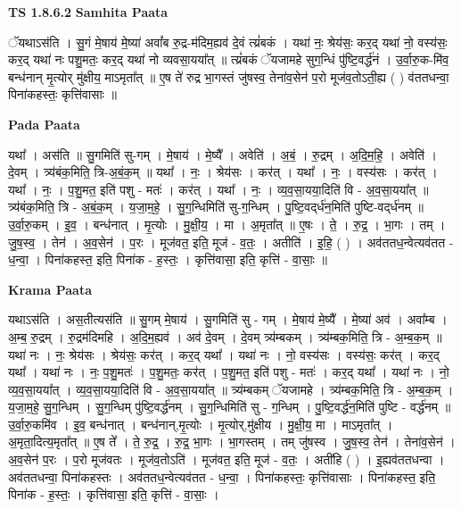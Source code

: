 \documentclass[17pt]{extarticle}
\begin{document}
\textbf{TS 1.8.6.2 } \newline
\textbf{Samhita Paata} \newline

ॅयथाऽस॑ति । सु॒गं मे॒षाय॑ मे॒ष्या॑ अवां᳚ब रु॒द्र-म॑दिम॒ह्यव॑ दे॒वं त्य्रं॑बकं । यथा॑ नः॒ श्रेय॑सः॒ कर॒द् यथा॑ नो॒ वस्य॑सः॒ कर॒द् यथा॑ नः पशु॒मतः॒ कर॒द् यथा॑ नो व्यवसा॒यया᳚त् ॥ त्य्रं॑बकं ॅयजामहे सुग॒न्धिं पु॑ष्टि॒वर्द्ध॑नं । उ॒र्वा॒रु॒क-मि॑व॒ बन्ध॑नान् मृ॒त्योर् मु॑क्षीय॒ माऽमृता᳚त् ॥ ए॒ष ते॑ रुद्र भा॒गस्तं जु॑षस्व॒ तेना॑व॒सेन॑ प॒रो मूज॑व॒तोऽती॒ह्य ( ) व॑ततधन्वा॒ पिना॑कहस्तः॒ कृत्ति॑वासाः ॥ \newline

\textbf{Pada Paata} \newline

यथा᳚ । अस॑ति ॥ सु॒गमिति॑ सु-गम् । मे॒षाय॑ । मे॒ष्यै᳚ । अवेति॑ । अ॒बं॒ । रु॒द्रम् । अ॒दि॒म॒हि॒ । अवेति॑ । दे॒वम् । त्र्य॑बंक॒मिति॒ त्रि-अ॒बं॒क॒म् ॥ यथा᳚ । नः॒ । श्रेय॑सः । कर॑त् । यथा᳚ । नः॒ । वस्य॑सः । कर॑त् । यथा᳚ । नः॒ । प॒शु॒मत॒ इति॑ पशु - मतः॑ । कर॑त् । यथा᳚ । नः॒ । व्य॒व॒सा॒यया॒दिति॑ वि - अ॒व॒सा॒यया᳚त् ॥ त्र्य॑बंक॒मिति॒ त्रि - अ॒बं॒क॒म् । य॒जा॒म॒हे॒ । सु॒ग॒न्धिमिति॑ सु-ग॒न्धिम् । पु॒ष्टि॒वद्‌र्ध॑न॒मिति॑ पुष्टि-वद्‌र्ध॑नम् ॥ उ॒र्वा॒रु॒कम् । इ॒व॒ । बन्ध॑नात् । मृ॒त्योः । मु॒क्षी॒य॒ । मा । अ॒मृता᳚त् ॥ ए॒षः । ते॒ । रु॒द्र॒ । भा॒गः । तम् । जु॒ष॒स्व॒ । तेन॑ । अ॒व॒सेन॑ । प॒रः । मूज॑वत॒ इति॒ मूज॑ - व॒तः॒ । अतीति॑ । इ॒हि॒ ( ) । अव॑ततध॒न्वेत्यव॑तत - ध॒न्वा॒ । पिना॑कहस्त॒ इति॒ पिना॑क - ह॒स्तः॒ । कृत्ति॑वासा॒ इति॒ कृत्ति॑ - वा॒साः॒ ॥  \newline


\textbf{Krama Paata} \newline

यथाऽस॑ति । अस॒तीत्यस॑ति ॥ सु॒गम् मे॒षाय॑ । सु॒गमिति॑ सु - गम् । मे॒षाय॑ मे॒ष्यै᳚ । मे॒ष्या॑ अव॑ । अवा᳚म्ब । अ॒म्ब॒ रु॒द्रम् । रु॒द्रम॑दिमहि । अ॒दि॒म॒ह्यव॑ । अव॑ दे॒वम् । दे॒वम् त्र्य॑म्बकम् । त्र्य॑म्बक॒मिति॒ त्रि - अ॒म्ब॒क॒म् ॥ यथा॑ नः । नः॒ श्रेय॑सः । श्रेय॑सः॒ कर॑त् । कर॒द् यथा᳚ । यथा॑ नः । नो॒ वस्य॑सः । वस्य॑सः॒ कर॑त् । कर॒द् यथा᳚ । यथा॑ नः । नः॒ प॒शु॒मतः॑ । प॒शु॒मतः॒ कर॑त् । प॒शु॒मत॒ इति॑ पशु - मतः॑ । कर॒द् यथा᳚ । यथा॑ नः । नो॒ व्य॒व॒सा॒यया᳚त् । व्य॒व॒सा॒यया॒दिति॑ वि - अ॒व॒सा॒यया᳚त् ॥ त्र्य॑म्बकम् ॅयजामहे । त्र्य॑म्बक॒मिति॒ त्रि - अ॒म्ब॒क॒म् । य॒जा॒म॒हे॒ सु॒ग॒न्धिम् । सु॒ग॒न्धिम् पु॑ष्टि॒वर्द्ध॑नम् । सु॒ग॒न्धिमिति॑ सु - ग॒न्धिम् । पु॒ष्टि॒वर्द्ध॑न॒मिति॑ पुष्टि - वर्द्ध॑नम् ॥ उ॒र्वा॒रु॒कमि॑व । इ॒व॒ बन्ध॑नात् । बन्ध॑नान्,मृ॒त्योः । मृ॒त्योर्,मु॑क्षीय । मु॒क्षी॒य॒ मा । माऽमृता᳚त् । अ॒मृता॒दित्य॒मृता᳚त् ॥ ए॒ष ते᳚ । ते॒ रु॒द्र॒ । रु॒द्र॒ भा॒गः । भा॒गस्तम् । तम् जु॑षस्व । जु॒ष॒स्व॒ तेन॑ । तेना॑व॒सेन॑ । अ॒व॒सेन॑ प॒रः । प॒रो मूज॑वतः । मूज॑व॒तोऽति॑ । मूज॑वत॒ इति॒ मूज॑ - व॒तः॒ । अती॑हि ( ) । इ॒ह्यव॑ततधन्वा । अव॑ततधन्वा॒ पिना॑कहस्तः । अव॑ततध॒न्वेत्यव॑तत - ध॒न्वा॒ । पिना॑कहस्तः॒ कृत्ति॑वासाः । पिना॑कहस्त॒ इति॒ पिना॑क - ह॒स्तः॒ । कृत्ति॑वासा॒ इति॒ कृत्ति॑ - वा॒साः॒ । \newline
\end{document}
